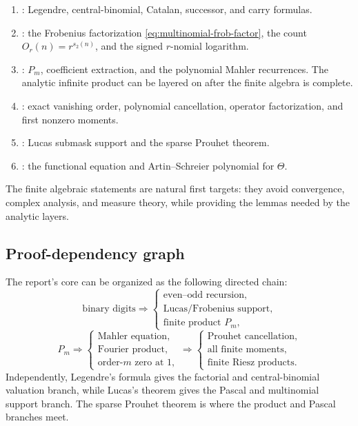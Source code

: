 \documentclass[11pt,oneside]{article}
\theoremstyle{definition}
\theoremstyle{remark}
\newcommand{\swt}{s_2}
\newcommand{\1}{\mathbf 1}
\begin{document}
\begin{enumerate}
\item {}: Legendre, central-binomial, Catalan, successor, and carry
      formulas.
\item {}: the Frobenius factorization
      \eqref{eq:multinomial-frob-factor}, the count \(O_r(n)=r^{\swt(n)}\), and the signed
      \(r\)-nomial logarithm.
\item {}: \(P_m\), coefficient extraction, and the
      polynomial Mahler recurrences.  The analytic infinite product can be layered on after
      the finite algebra is complete.
\item {}: exact vanishing order, polynomial cancellation, operator
      factorization, and first nonzero moments.
\item {}: Lucas submask support and the sparse Prouhet theorem.
\item {}: the functional equation and Artin--Schreier
      polynomial for \(\Theta\).
\end{enumerate}

The finite algebraic statements are natural first targets: they avoid convergence, complex
analysis, and measure theory, while providing the lemmas needed by the analytic layers.

\subsection{Proof-dependency graph}

The report's core can be organized as the following directed chain:
\[
 \text{binary digits}
 \Longrightarrow
 \begin{cases}
  \text{even--odd recursion},\\
  \text{Lucas/Frobenius support},\\
  \text{finite product }P_m,
 \end{cases}
\]
\[
 P_m
 \Longrightarrow
 \begin{cases}
  \text{Mahler equation},\\
  \text{Fourier product},\\
  \text{order-}\!m\text{ zero at }1,
 \end{cases}
 \Longrightarrow
 \begin{cases}
  \text{Prouhet cancellation},\\
  \text{all finite moments},\\
  \text{finite Riesz products}.
 \end{cases}
\]
Independently, Legendre's formula gives the factorial and central-binomial valuation branch,
while Lucas's theorem gives the Pascal and multinomial support branch.  The sparse Prouhet
theorem is where the product and Pascal branches meet.
\end{document}
